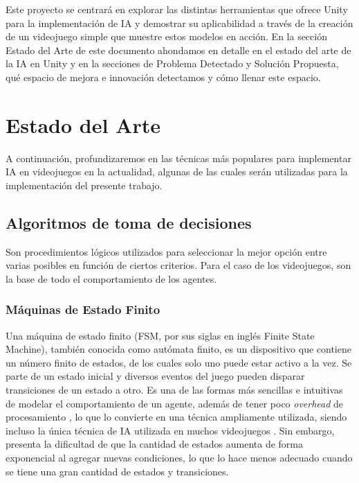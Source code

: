 \documentclass[a4paper]{article}
\begin{document}
Este proyecto se centrará en explorar las distintas herramientas que ofrece Unity para la implementación de IA y demostrar su aplicabilidad a través de la creación de un videojuego simple que muestre estos modelos en acción. En la sección Estado del Arte de este documento ahondamos en detalle en el estado del arte de la IA en Unity y en la secciones de Problema Detectado y Solución Propuesta, qué espacio de mejora e innovación detectamos y cómo llenar este espacio.

\section{Estado del Arte}

A continuación, profundizaremos en las técnicas más populares para implementar IA en videojuegos en la actualidad, algunas de las cuales serán utilizadas para la implementación del presente trabajo.

\subsection{Algoritmos de toma de decisiones}

Son procedimientos lógicos utilizados para seleccionar la mejor opción entre varias posibles en función de ciertos criterios. Para el caso de los videojuegos, son la base de todo el comportamiento de los agentes.

\subsubsection{Máquinas de Estado Finito}

Una máquina de estado finito (FSM, por sus siglas en inglés Finite State Machine), también conocida como autómata finito, es un dispositivo que contiene un número finito de estados, de los cuales solo uno puede estar activo a la vez. Se parte de un estado inicial y diversos eventos del juego pueden disparar transiciones de un estado a otro. Es una de las formas más sencillas e intuitivas de modelar el comportamiento de un agente, además de tener poco \textit{overhead} de procesamiento \cite{programming_game_ai_by_example}, lo que lo convierte en una técnica ampliamente utilizada, siendo incluso la única técnica de IA utilizada en muchos videojuegos \cite{unity_artificial_intelligence_programming}. Sin embargo, presenta la dificultad de que la cantidad de estados aumenta de forma exponencial al agregar nuevas condiciones, lo que lo hace menos adecuado cuando se tiene una gran cantidad de estados y transiciones.
\end{document}
